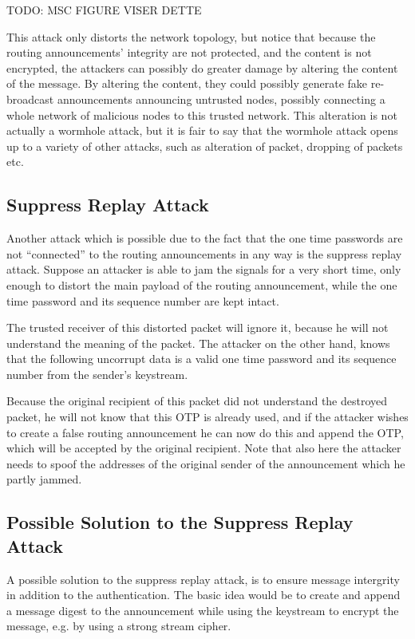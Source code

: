 TODO: MSC FIGURE VISER DETTE

This attack only distorts the network topology, but notice that because the
routing announcements' integrity are not protected, and the content is not
encrypted, the attackers can possibly do greater damage by altering the content
of the message. By altering the content, they could possibly generate fake
re-broadcast announcements announcing untrusted nodes, possibly connecting a
whole network of malicious nodes to this trusted network. This alteration is
not actually a wormhole attack, but it is fair to say that the wormhole attack
opens up to a variety of other attacks, such as alteration of packet, dropping
of packets etc.

\subsection{Suppress Replay Attack}
Another attack which is possible due to the fact that the one time passwords are
not ``connected'' to the routing announcements in any way is the suppress replay
attack. Suppose an attacker is able to jam the signals for a very short time,
only enough to distort the main payload of the routing announcement, while the
one time password and its sequence number are kept intact.

The trusted receiver of this distorted packet will ignore it, because he will
not understand the meaning of the packet. The attacker on the other hand, knows
that the following uncorrupt data is a valid one time password and its sequence
number from the sender's keystream.

Because the original recipient of this packet did not understand the destroyed
packet, he will not know that this \ac{OTP} is already used, and if the attacker
wishes to create a false routing announcement he can now do this and append the
\ac{OTP}, which will be accepted by the original recipient. Note that also here
the attacker needs to spoof the addresses of the original sender of the
announcement which he partly jammed.

\subsection{Possible Solution to the Suppress Replay Attack}
A possible solution to the suppress replay attack, is to ensure message
intergrity in addition to the authentication. The basic idea would be to create
and append a message digest to the announcement while using the keystream to
encrypt the message, e.g. by using a strong stream cipher.

